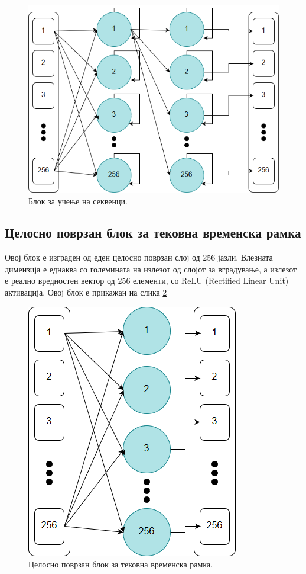 \begin{figure}[H]
	\centering
    \includegraphics[scale=0.5]{images/lstm_block.png}
	\caption{Блок за учење на секвенци.}
	\label{fig:lstm_block}
\end{figure}

\subsection{Целосно поврзан блок за тековна временска рамка}

Овој блок е изграден од еден целосно поврзан слој од 256 јазли. Влезната димензија е еднаква со големината на излезот од слојот за вградување, а излезот е реално вредностен вектор од 256 елементи, со ReLU (Rectified Linear Unit) активација. Овој блок е прикажан на слика \ref{fig:fully_connected_block}

\begin{figure}[H]
	\centering
    \includegraphics[scale=0.5]{images/fully_connected.png}
	\caption{Целосно поврзан блок за тековна временска рамка.}
	\label{fig:fully_connected_block}
\end{figure}

